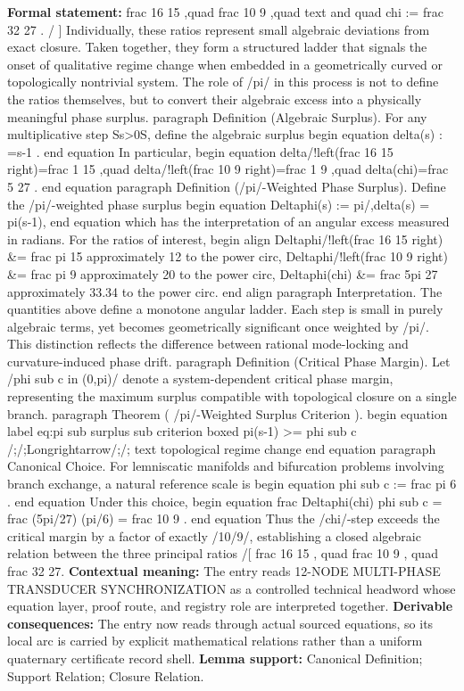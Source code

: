 \begingroup\footnotesize\setlength{\emergencystretch}{3em}\sloppy
\textbf{Formal statement:} frac 16 15 ,quad frac 10 9 ,quad text and quad chi := frac 32 27 . / ] Individually, these ratios represent small algebraic deviations from exact closure. Taken together, they form a structured ladder that signals the onset of qualitative regime change when embedded in a geometrically curved or topologically nontrivial system. The role of /pi/ in this process is not to define the ratios themselves, but to convert their algebraic excess into a physically meaningful phase surplus. paragraph Definition (Algebraic Surplus). For any multiplicative step Ss>0S, define the algebraic surplus begin equation delta(s) : =s-1 . end equation In particular, begin equation delta/!left(frac 16 15 right)=frac 1 15 ,quad delta/!left(frac 10 9 right)=frac 1 9 ,quad delta(chi)=frac 5 27 . end equation paragraph Definition (/pi/-Weighted Phase Surplus). Define the /pi/-weighted phase surplus begin equation Deltaphi(s) := pi/,delta(s) = pi(s-1), end equation which has the interpretation of an angular excess measured in radians. For the ratios of interest, begin align Deltaphi/!left(frac 16 15 right) \&= frac pi 15 approximately 12 to the power circ, Deltaphi/!left(frac 10 9 right) \&= frac pi 9 approximately 20 to the power circ, Deltaphi(chi) \&= frac 5pi 27 approximately 33.34 to the power circ. end align paragraph Interpretation. The quantities above define a monotone angular ladder. Each step is small in purely algebraic terms, yet becomes geometrically significant once weighted by /pi/. This distinction reflects the difference between rational mode-locking and curvature-induced phase drift. paragraph Definition (Critical Phase Margin). Let /phi sub c in (0,pi)/ denote a system-dependent critical phase margin, representing the maximum surplus compatible with topological closure on a single branch. paragraph Theorem ( /pi/-Weighted Surplus Criterion ). begin equation label eq:pi sub surplus sub criterion boxed pi(s-1) >= phi sub c /;/;Longrightarrow/;/; text topological regime change end equation paragraph Canonical Choice. For lemniscatic manifolds and bifurcation problems involving branch exchange, a natural reference scale is begin equation phi sub c := frac pi 6 . end equation Under this choice, begin equation frac Deltaphi(chi) phi sub c = frac (5pi/27) (pi/6) = frac 10 9 . end equation Thus the /chi/-step exceeds the critical margin by a factor of exactly /10/9/, establishing a closed algebraic relation between the three principal ratios /[ frac 16 15 , quad frac 10 9 , quad frac 32 27. \textbf{Contextual meaning:} The entry reads 12-NODE MULTI-PHASE TRANSDUCER SYNCHRONIZATION as a controlled technical headword whose equation layer, proof route, and registry role are interpreted together. \textbf{Derivable consequences:} The entry now reads through actual sourced equations, so its local arc is carried by explicit mathematical relations rather than a uniform quaternary certificate record shell. \textbf{Lemma support:} Canonical Definition; Support Relation; Closure Relation.\par
\endgroup

